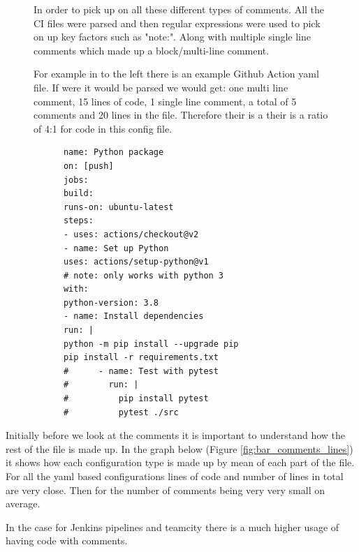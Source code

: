 \documentclass[twoside,12pt,titlepage,a4paper]{article}
\begin{document}
\begin{figure}[!htbp]
  \centering
  \begin{minipage}[t]{.48\textwidth}
    In order to pick up on all these different types of comments. All the CI files were parsed and then regular expressions were used to pick on up key factors such as "note:". Along with multiple single line comments which made up a block/multi-line comment.
    
    For example in to the left there is an example Github Action yaml file. If were it would be parsed we would get: one multi line comment, 15 lines of code, 1 single line comment, a total of 5 comments and 20 lines in the file. Therefore their is a their is a ratio of 4:1 for code in this config file.
  \end{minipage}%
  \hfill
  \begin{minipage}[t]{.48\textwidth}
    \begin{verbatim}
      name: Python package
      on: [push]
      jobs:
      build:
      runs-on: ubuntu-latest
      steps:
      - uses: actions/checkout@v2
      - name: Set up Python
      uses: actions/setup-python@v1
      # note: only works with python 3
      with:
      python-version: 3.8
      - name: Install dependencies
      run: |
      python -m pip install --upgrade pip
      pip install -r requirements.txt
      #      - name: Test with pytest
      #        run: |
      #          pip install pytest
      #          pytest ./src
    \end{verbatim}
  \end{minipage}
\end{figure}


Initially before we look at the comments it is important to understand how the rest of the file is made up. In the graph below (Figure \ref{fig:bar_comments_lines}) it shows how each configuration type is made up by mean of each part of the file. For all the yaml based configurations lines of code and number of lines in total are very close. Then for the number of comments being very very small on average.

In the case for Jenkins pipelines and teamcity there is a much higher usage of having code with comments. 
\end{document}
